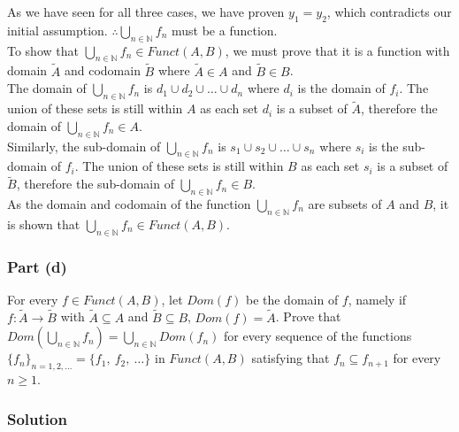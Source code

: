 \documentclass[12pt]{article}
\begin{document}
As we have seen for all three cases, we have proven $y_1 = y_2$, which contradicts our initial assumption. $\therefore \bigcup\limits_{n \in \mathbb{N}} f_n$ must be a function.\\
\null\newline
To show that $\bigcup\limits_{n \in \mathbb{N}} f_n \in Funct(A,B)$, we must prove that it is a function with domain $\tilde{A}$ and codomain $\tilde{B}$ where $\tilde{A} \in A$ and $\tilde{B} \in B$.\\
\null\newline
The domain of $\bigcup\limits_{n \in \mathbb{N}} f_n$ is $d_1 \cup d_2 \cup \ldots \cup d_n$ where $d_i$ is the domain of $f_i$. The union of these sets is still within $A$ as each set $d_i$ is a subset of $\tilde{A}$, therefore the domain of $\bigcup\limits_{n \in \mathbb{N}} f_n \in A$.\\
\null\newline
Similarly, the sub-domain of $\bigcup\limits_{n \in \mathbb{N}} f_n$ is $s_1 \cup s_2 \cup \ldots \cup s_n$ where $s_i$ is the sub-domain of $f_i$. The union of these sets is still within $B$ as each set $s_i$ is a subset of $\tilde{B}$, therefore the sub-domain of $\bigcup\limits_{n \in \mathbb{N}} f_n \in B$.\\
\null\newline
As the domain and codomain of the function $\bigcup\limits_{n \in \mathbb{N}} f_n$ are subsets of $A$ and $B$, it is shown that $\bigcup\limits_{n \in \mathbb{N}} f_n \in Funct(A,B)$.

\subsubsection*{Part (d)}

For every $f \in Funct(A, B)$, let $Dom(f)$ be the domain of $f$, namely if $f : \tilde{A} \rightarrow \tilde{B}$ with $\tilde{A} \subseteq A$ and $\tilde{B} \subseteq B$, $Dom(f) = \tilde{A}$.
Prove that $Dom(\bigcup\limits_{n \in \mathbb{N}} f_n) = \bigcup\limits_{n \in \mathbb{N}} Dom(f_n)$ for every sequence of the functions $\{ f_n \}_{n=1,2,\ldots} = \{ f_1,\ f_2,\ \ldots \}$ in $Funct(A, B)$ satisfying that $f_n \subseteq f_{n+1}$ for every $n \geq 1$.

\subsubsection*{Solution}
\end{document}
